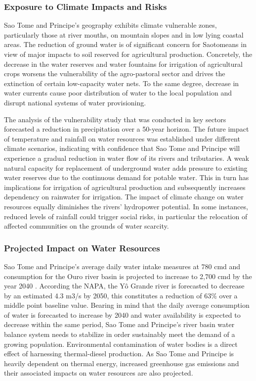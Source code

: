 \documentclass[
]{book}
\begin{document}
\hypertarget{exposure-to-climate-impacts-and-risks-13}{%
\subsubsection{Exposure to Climate Impacts and Risks}\label{exposure-to-climate-impacts-and-risks-13}}

Sao Tome and Principe's geography exhibits climate vulnerable zones, particularly those at river mouths, on mountain slopes and in low lying coastal areas. The reduction of ground water is of significant concern for Saotomeans in view of major impacts to soil reserved for agricultural production. Concretely, the decrease in the water reserves and water fountains for irrigation of agricultural crops worsens the vulnerability of the agro-pastoral sector and drives the extinction of certain low-capacity water nets. To the same degree, decrease in water currents cause poor distribution of water to the local population and disrupt national systems of water provisioning.

The analysis of the vulnerability study that was conducted in key sectors forecasted a reduction in precipitation over a 50-year horizon. The future impact of temperature and rainfall on water resources was established under different climate scenarios, indicating with confidence that Sao Tome and Principe will experience a gradual reduction in water flow of its rivers and tributaries. A weak natural capacity for replacement of underground water adds pressure to existing water reserves due to the continuous demand for potable water. This in turn has implications for irrigation of agricultural production and subsequently increases dependency on rainwater for irrigation. The impact of climate change on water resources equally diminishes the rivers' hydropower potential. In some instances, reduced levels of rainfall could trigger social risks, in particular the relocation of affected communities on the grounds of water scarcity.

\hypertarget{projected-impact-on-water-resources-1}{%
\subsubsection{Projected Impact on Water Resources}\label{projected-impact-on-water-resources-1}}

Sao Tome and Principe's average daily water intake measures at 780 cmd and consumption for the Ouro river basin is projected to increase to 2,700 cmd by the year 2040 . According the NAPA, the Yô Grande river is forecasted to decrease by an estimated 4.3 m3/s by 2050, this constitutes a reduction of 63\% over a middle point baseline value. Bearing in mind that the daily average consumption of water is forecasted to increase by 2040 and water availability is expected to decrease within the same period, Sao Tome and Principe's river basin water balance system needs to stabilize in order sustainably meet the demand of a growing population. Environmental contamination of water bodies is a direct effect of harnessing thermal-diesel production. As Sao Tome and Principe is heavily dependent on thermal energy, increased greenhouse gas emissions and their associated impacts on water resources are also projected.
\end{document}
